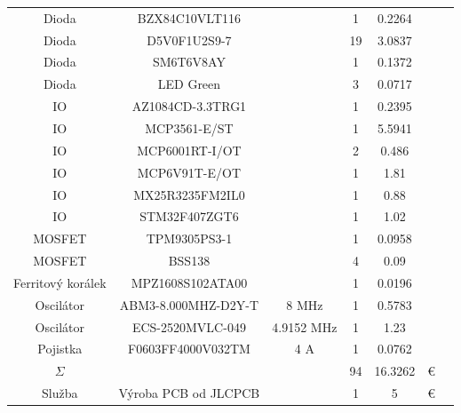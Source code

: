 \begin{table}[H]
\begin{ctucolortab}
\begin{tabular}{ccccccc}
            Dioda                 & BZX84C10VLT116         &               & 1     & 0.2264   &          & \\
            Dioda                 & D5V0F1U2S9-7           &               & 19    & 3.0837   &          & \\
            Dioda                 & SM6T6V8AY              &               & 1     & 0.1372   &          & \\
            Dioda                 & LED Green              &               & 3     & 0.0717   &          & \\
            IO                    & AZ1084CD-3.3TRG1       &               & 1     & 0.2395   &          & \\
            IO                    & MCP3561-E/ST           &               & 1     & 5.5941   &          & \\
            IO                    & MCP6001RT-I/OT         &               & 2     & 0.486    &          & \\
            IO                    & MCP6V91T-E/OT          &               & 1     & 1.81     &          & \\
            IO                    & MX25R3235FM2IL0        &               & 1     & 0.88     &          & \\
            IO                    & STM32F407ZGT6          &               & 1     & 1.02     &          & \\
            MOSFET                & TPM9305PS3-1           &               & 1     & 0.0958   &          & \\
            MOSFET                & BSS138                 &               & 4     & 0.09     &          & \\
            Ferritový korálek     & MPZ1608S102ATA00       &               & 1     & 0.0196   &          & \\
            Oscilátor             & ABM3-8.000MHZ-D2Y-T    & 8 MHz         & 1     & 0.5783   &          & \\
            Oscilátor             & ECS-2520MVLC-049       & 4.9152 MHz    & 1     & 1.23     &          & \\
            Pojistka              & F0603FF4000V032TM      & 4 A           & 1     & 0.0762   &          & \\
            \bottomrule
            $\Sigma$              &                        &               & 94    & 16.3262  & €        & \\
            \bottomrule
            Služba                & Výroba PCB od JLCPCB   &               & 1     & 5        & €        & \\

\end{tabular}
\end{ctucolortab}
\end{table}

